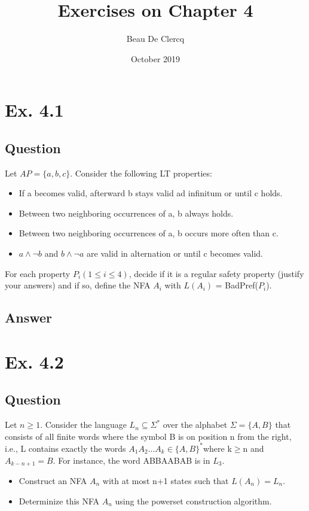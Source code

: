 \documentclass[12pt]{article}
\title{Exercises on Chapter 4}
\author{Beau De Clercq}
\date{October 2019}
\begin{document}
\maketitle{}


\clearpage
\newpage

\section*{Ex. 4.1}
\subsection*{Question}
Let $AP = \{ a, b, c \}$. Consider the following LT properties:
\begin{itemize}
	\item If a becomes valid, afterward b stays valid ad infinitum or until c holds.
	\item Between two neighboring occurrences of a, b always holds.
	\item Between two neighboring occurrences of a, b occurs more often than c.
	\item $a\wedge \neg b$ and $b \wedge \neg a$ are valid in alternation or until c becomes valid.
\end{itemize}
For each property $P_i (1\leq i\leq 4)$, decide if it is a regular safety property (justify your answers) and
if so, define the NFA $A_i$ with $L(A_i)$ = BadPref($P_i$).

\subsection*{Answer}

\newpage
\section*{Ex. 4.2}
\subsection*{Question}
Let $n \geq 1$. Consider the language $L_n \subseteq \Sigma ^*$ over the alphabet $\Sigma = \{A,B\}$ that
consists of all finite words where the symbol B is on position n from the right, i.e., L contains
exactly the words $A_1A_2...A_k \in \{A,B\}^*$where k$\geq$n and $A_{k−n+1} = B$. For instance, the word
ABBAABAB is in $L_3$.
\begin{itemize}
	\item Construct an NFA $A_n$ with at most n+1 states such that $L(A_n) = L_n$.
	\item Determinize this NFA $A_n$ using the powerset construction algorithm.
\end{itemize}
\end{document}
